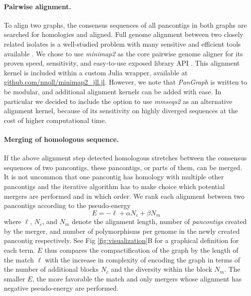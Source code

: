 \documentclass[aps,rmp,preprint,superscriptaddress,10pt,linenumbers]{revtex4-1}
\begin{document}
\paragraph*{Pairwise alignment.}
To align two graphs, the consensus sequences of all pancontigs in both graphs are searched for homologies and aligned.
Full genome alignment between two closely related isolates is a well-studied problem with many sensitive and efficient tools available \cite{li2018minimap2,marccais2018mummer4}.
We chose to use \emph{minimap2} as the core pairwise genome aligner for its proven speed, sensitivity, and easy-to-use exposed library API \cite{li2018minimap2}.
This alignment kernel is included within a custom Julia wrapper, available at \url{github.com/nnoll/minimap2_jll.jl}.
However, we note that \emph{PanGraph} is written to be modular, and additional alignment kernels can be added with ease.
In particular we decided to include the option to use \emph{mmseqs2} \cite{steinegger2017mmseqs2} as an alternative alignment kernel, because of its sensitivity on highly diverged sequences at the cost of higher computational time.

\paragraph*{Merging of homologous sequence.}
If the above alignment step detected homologous stretches between the consensus sequences of two pancontigs, these pancontigs, or parts of them, can be merged.
It is not uncommon that one pancontig has homology with multiple other pancontigs and the iterative algorithm has to make choice which potential mergers are performed and in which order.
We rank each alignment between two pancontigs according to the pseudo-energy
\begin{equation}\label{eq:pseudo-energy}
    E = -\ell + \alpha N_c + \beta N_m
\end{equation}
where $\ell$, $N_c$, and $N_m$ denote the alignment length, number of \emph{pancontigs} created by the merger, and number of polymorphisms per genome in the newly created {pancontig} respectively.
See Fig \ref{fig:visualization}B for a graphical definition for each term.
$E$ thus compares the compactification of the graph by the length of the match $\ell$ with the increase in complexity of encoding the graph in terms of the number of additional blocks $N_c$ and the diversity within the block $N_m$. 
The smaller $E$, the more favorable the match and only mergers whose alignment has negative pseudo-energy are performed.
\end{document}
